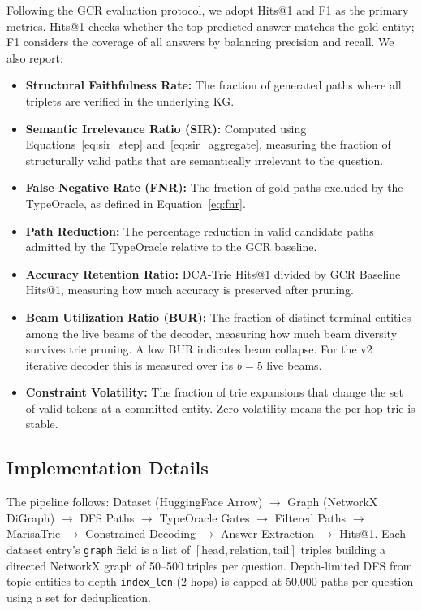 Following the GCR evaluation protocol, we adopt Hits@1 and F1 as the primary metrics. Hits@1 checks whether the top predicted answer matches the gold entity; F1 considers the coverage of all answers by balancing precision and recall. We also report:

\begin{itemize}
  \item \textbf{Structural Faithfulness Rate:} The fraction of generated paths where all triplets are verified in the underlying KG.
  \item \textbf{Semantic Irrelevance Ratio (SIR):} Computed using Equations~\eqref{eq:sir_step} and~\eqref{eq:sir_aggregate}, measuring the fraction of structurally valid paths that are semantically irrelevant to the question.
  \item \textbf{False Negative Rate (FNR):} The fraction of gold paths excluded by the TypeOracle, as defined in Equation~\eqref{eq:fnr}.
  \item \textbf{Path Reduction:} The percentage reduction in valid candidate paths admitted by the TypeOracle relative to the GCR baseline.
  \item \textbf{Accuracy Retention Ratio:} DCA-Trie Hits@1 divided by GCR Baseline Hits@1, measuring how much accuracy is preserved after pruning.
  \item \textbf{Beam Utilization Ratio (BUR):} The fraction of distinct terminal entities among the live beams of the decoder, measuring how much beam diversity survives trie pruning. A low BUR indicates beam collapse. For the v2 iterative decoder this is measured over its $b{=}5$ live beams.
  \item \textbf{Constraint Volatility:} The fraction of trie expansions that change the set of valid tokens at a committed entity. Zero volatility means the per-hop trie is stable.
\end{itemize}

\subsection{Implementation Details}
\label{sec:ch4impl}

The pipeline follows: Dataset (HuggingFace Arrow) $\to$ Graph (NetworkX DiGraph) $\to$ DFS Paths $\to$ TypeOracle Gates $\to$ Filtered Paths $\to$ MarisaTrie $\to$ Constrained Decoding $\to$ Answer Extraction $\to$ Hits@1. Each dataset entry's \texttt{graph} field is a list of $[\text{head}, \text{relation}, \text{tail}]$ triples building a directed NetworkX graph of 50--500 triples per question. Depth-limited DFS from topic entities to depth \texttt{index\_len} (2 hops) is capped at 50,000 paths per question using a set for deduplication.


